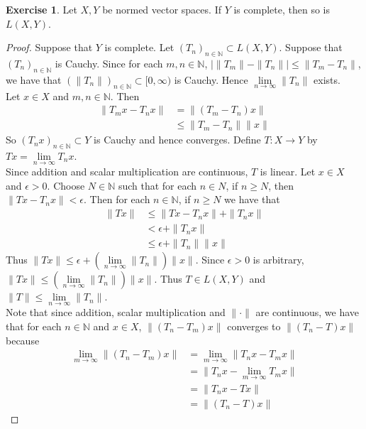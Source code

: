 \documentclass[12pt]{amsart}
\theoremstyle{definition}
\theoremstyle{remark}
\theoremstyle{definition}
\newtheorem{ex}[definition]{Exercise}
\newcommand{\ep}{\epsilon}
\newcommand{\N}{\mathbb{N}}
\newcommand{\Rg}{[0,\infty)}
\newcommand{\limn}{\lim \limits_{n \rightarrow \infty}}
\begin{document}
	\begin{ex}
		Let $X,Y$ be normed vector spaces. If $Y$ is complete, then so is $L(X,Y)$.
	\end{ex}
	
	\begin{proof}
		Suppose that $Y$ is complete. Let $(T_n)_{n \in \N} \subset L(X,Y)$. Suppose that $(T_n)_{n \in \N}$ is Cauchy. Since for each $m,n \in \N$, $\big\vert \|T_m \|- \|T_n \|\big\vert \leq \|T_m -T_n \|$, we have that $(\|T_n \|)_{n \in \N} \subset \Rg$ is Cauchy. Hence $\lim\limits_{n \rightarrow \infty}\|T_n \|$ exists. \vspace{1cm} \\ Let $x \in X$ and $m,n \in \N$. Then 
		\begin{align*}
			\|T_m x - T_n x \|
			&= \|(T_m-T_n) x \|\\
			&\leq \|T_m-T_n \|\|x \|
		\end{align*}
		So $(T_nx)_{n \in \N} \subset Y$ is Cauchy and hence converges. Define $T:X \rightarrow Y$ by $Tx = \lim\limits_{n \rightarrow \infty} T_nx$. \vspace{1cm}\\
		Since addition and scalar multiplication are continuous, $T$ is linear. Let $x \in X$ and $\ep>0$. Choose $N \in \N$ such that for each $n \in N$, if $n \geq N$, then $\|Tx - T_n x\|< \ep$. Then for each $n \in \N$, if $n \geq N$ we have that 
		\begin{align*}
			\|Tx\|
			&\leq \|Tx-T_nx \|+ \|T_nx \|\\
			&< \ep + \|T_nx \|\\
			&\leq \ep + \|T_n \|\|x \|
		\end{align*}  
		Thus $\|Tx \|\leq \ep +(\lim\limits_{n \rightarrow \infty} \|T_n \|) \|x \|$. Since $\ep >0$ is arbitrary, $\|Tx \|\leq (\lim\limits_{n \rightarrow \infty} \|T_n \|) \|x \|$. Thus $T \in L(X,Y)$ and $\|T \|\leq \limn \|T_n \|$. \vspace{1cm} \\
		Note that since addition, scalar multiplication and $\|\cdot \|$ are continuous, we have that for each $n \in \N$ and $x \in X$, $\|(T_n-T_m)x \|$ converges to $\|(T_n-T)x \|$ because 
		\begin{align*}
			\lim_{m \rightarrow \infty} \|(T_n-T_m)x \|
			&= \lim_{m \rightarrow \infty} \|T_nx-T_mx \|\\
			&= \|T_nx-\lim_{m \rightarrow \infty}T_mx \|\\
			&=\|T_nx-Tx \|\\
			&= \|(T_n-T)x \|

\end{align*}
\end{proof}
\end{document}
